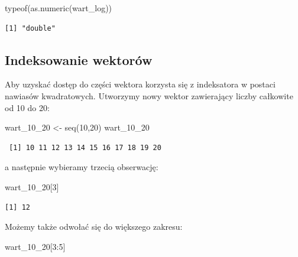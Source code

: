 \documentclass[
  letterpaper,
  DIV=11,
  numbers=noendperiod]{scrreprt}
\newenvironment{Shaded}{\begin{snugshade}}{\end{snugshade}}
\newcommand{\DecValTok}[1]{\textcolor[rgb]{0.68,0.00,0.00}{#1}}
\newcommand{\FunctionTok}[1]{\textcolor[rgb]{0.28,0.35,0.67}{#1}}
\newcommand{\NormalTok}[1]{\textcolor[rgb]{0.00,0.23,0.31}{#1}}
\newcommand{\OtherTok}[1]{\textcolor[rgb]{0.00,0.23,0.31}{#1}}
\newcommand{\SpecialCharTok}[1]{\textcolor[rgb]{0.37,0.37,0.37}{#1}}
\begin{document}
\begin{Shaded}
\begin{Highlighting}[]
\FunctionTok{typeof}\NormalTok{(}\FunctionTok{as.numeric}\NormalTok{(wart\_log))}
\end{Highlighting}
\end{Shaded}

\begin{verbatim}
[1] "double"
\end{verbatim}

\hypertarget{indeksowanie-wektoruxf3w}{%
\subsection{Indeksowanie wektorów}\label{indeksowanie-wektoruxf3w}}

Aby uzyskać dostęp do części wektora korzysta się z indeksatora w
postaci nawiasów kwadratowych. Utworzymy nowy wektor zawierający liczby
całkowite od 10 do 20:

\begin{Shaded}
\begin{Highlighting}[]
\NormalTok{wart\_10\_20 }\OtherTok{\textless{}{-}} \FunctionTok{seq}\NormalTok{(}\DecValTok{10}\NormalTok{,}\DecValTok{20}\NormalTok{)}
\NormalTok{wart\_10\_20}
\end{Highlighting}
\end{Shaded}

\begin{verbatim}
 [1] 10 11 12 13 14 15 16 17 18 19 20
\end{verbatim}

a następnie wybieramy trzecią obserwację:

\begin{Shaded}
\begin{Highlighting}[]
\NormalTok{wart\_10\_20[}\DecValTok{3}\NormalTok{]}
\end{Highlighting}
\end{Shaded}

\begin{verbatim}
[1] 12
\end{verbatim}

Możemy także odwołać się do większego zakresu:

\begin{Shaded}
\begin{Highlighting}[]
\NormalTok{wart\_10\_20[}\DecValTok{3}\SpecialCharTok{:}\DecValTok{5}\NormalTok{]}
\end{Highlighting}
\end{Shaded}
\end{document}
